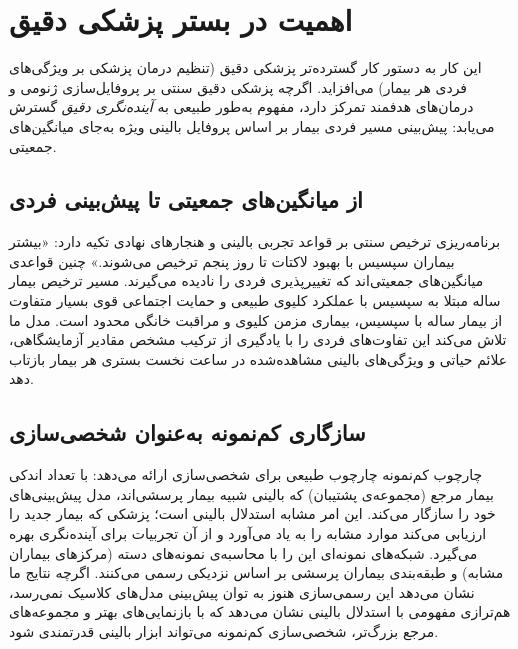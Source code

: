 \section{اهمیت در بستر پزشکی دقیق}

این کار به دستور کار گسترده‌تر پزشکی دقیق (تنظیم درمان پزشکی بر ویژگی‌های فردی هر بیمار) می‌افزاید. اگرچه پزشکی دقیق سنتی بر پروفایل‌سازی ژنومی و درمان‌های هدفمند تمرکز دارد، مفهوم به‌طور طبیعی به \emph{آینده‌نگری دقیق} گسترش می‌یابد: پیش‌بینی مسیر فردی بیمار بر اساس پروفایل بالینی ویژه به‌جای میانگین‌های جمعیتی.

\subsection{از میانگین‌های جمعیتی تا پیش‌بینی فردی}

برنامه‌ریزی ترخیص سنتی بر قواعد تجربی بالینی و هنجارهای نهادی تکیه دارد: «بیشتر بیماران سپسیس با بهبود لاکتات تا روز پنجم ترخیص می‌شوند.» چنین قواعدی میانگین‌های جمعیتی‌اند که تغییرپذیری فردی را نادیده می‌گیرند. مسیر ترخیص بیمار  ساله مبتلا به سپسیس با عملکرد کلیوی طبیعی و حمایت اجتماعی قوی بسیار متفاوت از بیمار  ساله با سپسیس، بیماری مزمن کلیوی و مراقبت خانگی محدود است. مدل ما تلاش می‌کند این تفاوت‌های فردی را با یادگیری از ترکیب مشخص مقادیر آزمایشگاهی، علائم حیاتی و ویژگی‌های بالینی مشاهده‌شده در  ساعت نخست بستری  هر بیمار بازتاب دهد.

\subsection{سازگاری کم‌نمونه به‌عنوان شخصی‌سازی}

چارچوب کم‌نمونه چارچوب طبیعی برای شخصی‌سازی ارائه می‌دهد: با تعداد اندکی بیمار مرجع (مجموعه‌ی پشتیبان) که بالینی شبیه بیمار پرسشی‌اند، مدل پیش‌بینی‌های خود را سازگار می‌کند. این امر مشابه استدلال بالینی است؛ پزشکی که بیمار جدید را ارزیابی می‌کند موارد مشابه را به یاد می‌آورد و از آن تجربیات برای آینده‌نگری بهره می‌گیرد. شبکه‌های نمونه‌ای این را با محاسبه‌ی نمونه‌های دسته (مرکزهای بیماران مشابه) و طبقه‌بندی بیماران پرسشی بر اساس نزدیکی رسمی می‌کنند. اگرچه نتایج ما نشان می‌دهد این رسمی‌سازی هنوز به توان پیش‌بینی مدل‌های کلاسیک نمی‌رسد، هم‌ترازی مفهومی با استدلال بالینی نشان می‌دهد که با بازنمایی‌های بهتر و مجموعه‌های مرجع بزرگ‌تر، شخصی‌سازی کم‌نمونه می‌تواند ابزار بالینی قدرتمندی شود.

